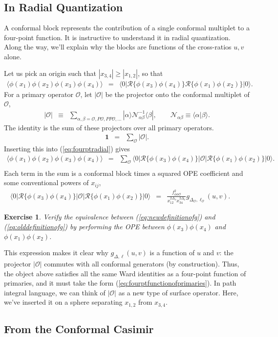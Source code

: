 \documentclass[11pt]{ws-rv9x6}
\newcommand\be{\begin{eqnarray}}
\newcommand\ee{\end{eqnarray}}
\newcommand\f\phi
\newcommand\cO{\mathcal{O}}
\newcommand\<\langle
\renewcommand\>\rangle
\newcommand\nn{\nonumber}
\renewcommand\.{\cdot}
\newcommand\De{\Delta}
\renewcommand\b\beta
\renewcommand\a\alpha
\newtheorem{exercise}{Exercise}[section]
\begin{document}
\subsection{In Radial Quantization}

A conformal block represents the contribution of a single conformal multiplet to a four-point function.  It is instructive to understand it in radial quantization.  Along the way, we'll explain why the blocks are functions of the cross-ratios $u,v$ alone.

Let us pick an origin such that $|x_{3,4}|\geq |x_{1,2}|$, so that
\be
\label{eq:fourptradial}
\<\f(x_1)\f(x_2)\f(x_3)\f(x_4)\> &=& \<0|\mathcal{R}\{\f(x_3)\f(x_4)\}\mathcal{R}\{\f(x_1)\f(x_2)\}|0\>.\quad
\ee
For a primary operator $\cO$, let $|\cO|$ be the projector onto the conformal multiplet of $\cO$,
\be
|\cO| &\equiv& \sum_{\a,\b=\cO,P\cO,PP\cO,\dots} |\a\>\mathcal{N}^{-1}_{\a\b}\<\b|,\qquad
\mathcal{N}_{\a\b} \equiv \<\a|\b\>.
\ee
The identity is the sum of these projectors over all primary operators.
\be
\mathbf{1} &=& \sum_\cO |\cO|.
\ee
Inserting this into (\ref{eq:fourptradial}) gives
\be
\label{eq:insertingprojector}
\<\f(x_1)\f(x_2)\f(x_3)\f(x_4)\> &=& \sum_\cO\<0|\mathcal{R}\{\f(x_3)\f(x_4)\}|\cO|\mathcal{R}\{\f(x_1)\f(x_2)\}|0\>.\nn\\
\ee
Each term in the sum is a conformal block times a squared OPE coefficient and some conventional powers of $x_{ij}$,
\be
\label{eq:newdefinitionofg}
\<0|\mathcal{R}\{\f(x_3)\f(x_4)\}|\cO|\mathcal{R}\{\f(x_1)\f(x_2)\}|0\> &=& \frac{f_{\f\f\cO}^2}{x_{12}^{2\De_\f}x_{34}^{2\De_\f}}g_{\De_\cO,\ell_\cO}(u,v).\qquad
\ee
\begin{exercise}
Verify the equivalence between (\ref{eq:newdefinitionofg}) and (\ref{eq:olddefinitionofg}) by performing the OPE between $\f(x_3)\f(x_4)$ and $\f(x_1)\f(x_2)$.
\end{exercise}

This expression makes it clear why $g_{\De,\ell}(u,v)$ is a function of $u$ and $v$: the projector $|\cO|$ commutes with all conformal generators (by construction).  Thus, the object above satisfies all the same Ward identities as a four-point function of primaries, and it must take the form (\ref{eq:fourptfunctionofprimaries}).  In path integral language, we can think of $|\cO|$ as a new type of  surface operator.  Here, we've inserted it on a sphere separating $x_{1,2}$ from $x_{3,4}$.

\subsection{From the Conformal Casimir}
\end{document}
